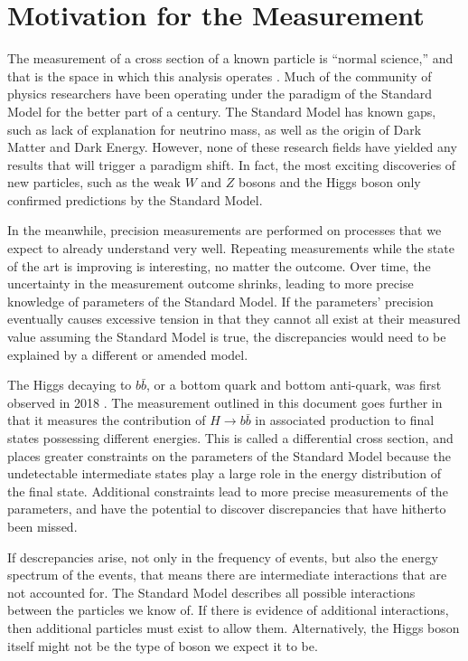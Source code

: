 \section{Motivation for the Measurement}

The measurement of a cross section of a known particle is ``normal science,''
and that is the space in which this analysis operates \cite{Kuhn:1970}.
Much of the community of physics researchers have been operating under the paradigm
of the Standard Model \cite{PhysRevLett.19.1264} for the better part of a century.
The Standard Model has known gaps,
such as lack of explanation for neutrino mass,
as well as the origin of Dark Matter and Dark Energy.
However, none of these research fields have yielded any results
that will trigger a paradigm shift.
In fact, the most exciting discoveries of new particles,
such as the weak $W$ \cite{PhysRevLett.50.1738} and $Z$ \cite{dau1983ua1}
bosons and the Higgs boson \cite{Chatrchyan_2012,PhysRevD.86.032003} only confirmed
predictions by the Standard Model.

In the meanwhile, precision measurements are performed on
processes that we expect to already understand very well.
Repeating measurements while the state of the art is improving is interesting,
no matter the outcome.
Over time, the uncertainty in the measurement outcome shrinks,
leading to more precise knowledge of parameters of the Standard Model.
If the parameters' precision eventually causes excessive tension in that they cannot all exist
at their measured value assuming the Standard Model is true,
the discrepancies would need to be explained by a different or amended model.

The Higgs decaying to $b\bar{b}$, or a bottom quark and bottom anti-quark,
was first observed in 2018 \cite{obs-18, Aaboud_2018}.
The measurement outlined in this document goes further in that
it measures the contribution of $H \rightarrow b\bar{b}$ in associated production
to final states possessing different energies.
This is called a differential cross section,
and places greater constraints on the parameters of the Standard Model because
the undetectable intermediate states play a large role in the energy distribution of the final state.
Additional constraints lead to more precise measurements of the parameters,
and have the potential to discover discrepancies that have hitherto been missed.

If descrepancies arise, not only in the frequency of events,
but also the energy spectrum of the events,
that means there are intermediate interactions that are not accounted for.
The Standard Model describes all possible interactions between the particles we know of.
If there is evidence of additional interactions, then additional particles must exist to allow them.
Alternatively, the Higgs boson itself might not be the type of boson we expect it to be.

